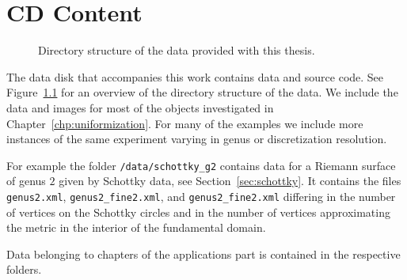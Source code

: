 \documentclass[Thesis]{subfiles}
\begin{document}
\chapter{CD Content}

\begin{figure}
\vspace{0.2cm}
\caption{Directory structure of the data provided with this thesis.}
\label{fig:dir_structure}
\end{figure}

The data disk that accompanies this work contains data and source code. 
See Figure~\ref{fig:dir_structure} for an overview of the directory structure of the data. 
We include the data and images for most of the objects investigated in Chapter~\ref{chp:uniformization}. 
For many of the examples we include more instances of the same experiment varying in genus or discretization resolution.

For example the folder {\tt /data/schottky\_g2} contains data for a Riemann surface of genus $2$ given by Schottky data, see Section~\ref{sec:schottky}.
It contains the files {\tt genus2.xml}, {\tt genus2\_fine2.xml}, and {\tt genus2\_fine2.xml} differing in the number of vertices on the Schottky circles and in the number of vertices approximating the metric in the interior of the fundamental domain.

Data belonging to chapters of the applications part is contained in the respective folders. 
\end{document}
